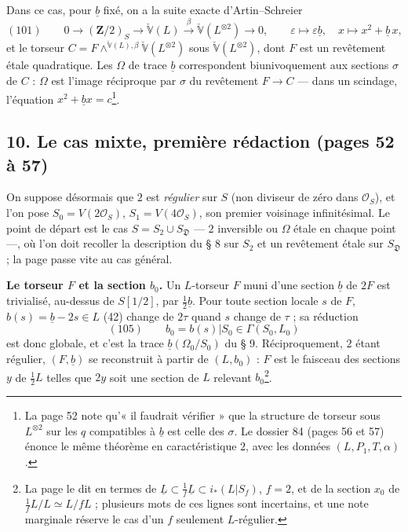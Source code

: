 \documentclass[11pt,a4paper]{article}
\begin{document}
Dans ce cas, pour $\underline{b}$ fixé, on a la suite exacte d'Artin--Schreier
\[
  (101) \qquad 0 \to (\mathbf{Z}/2)_S \to \check{\mathbb{V}}(L) \xrightarrow{\ \beta\ }
  \check{\mathbb{V}}(L^{\otimes 2}) \to 0, \qquad \varepsilon \mapsto
  \varepsilon\underline{b}, \quad x \mapsto x^2 + \underline{b}\,x,
\]
et le torseur $C = F \wedge^{\check{\mathbb{V}}(L), \beta} \check{\mathbb{V}}(L^{\otimes
2})$ sous $\check{\mathbb{V}}(L^{\otimes 2})$, dont $F$ est un revêtement étale
quadratique. Les $\Omega$ de trace $\underline{b}$ correspondent biunivoquement aux
sections $\sigma$ de $C$ : $\Omega$ est l'image réciproque par $\sigma$ du revêtement
$F \to C$ — dans un scindage, l'équation $x^2 + \underline{b}x = c$\footnote{La page 52 note qu'« il faudrait vérifier » que la structure de torseur sous
$L^{\otimes 2}$ sur les $q$ compatibles à $\underline{b}$ est celle des $\sigma$. Le
dossier 84 (pages 56 et 57) énonce le même théorème en caractéristique $2$, avec
les données $(L, P_1, T, \alpha)$.}.

\subsection*{10. Le cas mixte, première rédaction (pages 52 à 57)}

On suppose désormais que $2$ est \emph{régulier} sur $S$ (non diviseur de zéro
dans $\mathcal{O}_S$), et l'on pose $S_0 = V(2\mathcal{O}_S)$, $S_1 = V(4\mathcal{O}_S)$, son
premier voisinage infinitésimal. Le point de départ est le cas $S = S_2 \cup
S_{\mathfrak{D}}$ — $2$ inversible ou $\Omega$ étale en chaque point —, où l'on doit
recoller la description du § 8 sur $S_2$ et un revêtement étale sur
$S_{\mathfrak{D}}$ ; la page passe vite au cas général.

\textbf{Le torseur $F$ et la section $b_0$.} Un $L$-torseur $F$ muni d'une section
$\underline{b}$ de $2F$ est trivialisé, au-dessus de $S[1/2]$, par
$\tfrac{1}{2}\underline{b}$. Pour toute section locale $s$ de $F$, $b(s) =
\underline{b} - 2s \in L$ (42) change de $2\tau$ quand $s$ change de $\tau$ ; sa
réduction
\[
  (105) \qquad b_0 = b(s)|S_0 \in \Gamma(S_0, L_0)
\]
est donc globale, et c'est la trace $\underline{b}(\Omega_0/S_0)$ du § 9.
Réciproquement, $2$ étant régulier, $(F, \underline{b})$ se reconstruit à partir de
$(L, b_0)$ : $F$ est le faisceau des sections $y$ de $\tfrac{1}{2}L$ telles que $2y$
soit une section de $L$ relevant $b_0$\footnote{La page le dit en termes de
$\underline{L} \subset \tfrac{1}{f}\underline{L} \subset i_*(L|S_f)$, $f = 2$, et de la
section $x_0$ de $\tfrac{1}{f}L/L \simeq L/fL$ ; plusieurs mots de ces lignes sont
incertains, et une note marginale réserve le cas d'un $f$ seulement
$L$-régulier.}.
\end{document}

